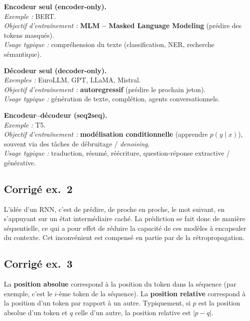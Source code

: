 \documentclass[11pt,a4paper]{article}
\begin{document}
\begin{description}[
  leftmargin=0pt,
  style=nextline,
  font=\normalfont,
  itemsep=1.0\baselineskip,
  parsep=0pt
]
\textbf{Encodeur seul (encoder-only).}\\
\emph{Exemple :} BERT.\\
\emph{Objectif d’entraînement :} \textbf{MLM – Masked Language Modeling} (prédire des tokens masqués).\\
\emph{Usage typique :} compréhension du texte (classification, NER, recherche sémantique).

\medskip

\textbf{Décodeur seul (decoder-only).}\\
\emph{Exemples :} EuroLLM, GPT, LLaMA, Mistral.\\
\emph{Objectif d’entraînement :} \textbf{autoregressif} (prédire le prochain jeton).\\
\emph{Usage typique :} génération de texte, complétion, agents conversationnels.

\medskip

\textbf{Encodeur--décodeur (seq2seq).}\\
\emph{Exemple :} T5.\\
\emph{Objectif d’entraînement :} \textbf{modélisation conditionnelle} (apprendre $p(y \mid x)$), souvent via des tâches de débruitage / \emph{denoising}.\\
\emph{Usage typique :} traduction, résumé, réécriture, question-réponse extractive / générative.

\subsection*{Corrigé ex.~2}

L’idée d’un RNN, c’est de prédire, de proche en proche, le mot suivant, en s’appuyant sur un état intermédiaire caché. La prédiction se fait donc de manière séquentielle, ce qui a pour effet de réduire la capacité de ces modèles à encapsuler du contexte. Cet inconvénient est compensé en partie par de la rétropropagation.

\subsection*{Corrigé ex.~3}

La \textbf{position absolue} correspond à la position du token dans la séquence (par exemple, c'est le $i$-ème token de la séquence). La \textbf{position relative} correspond à la position d'un token par rapport à un autre. Typiquement, si $p$ est la position absolue d'un token et $q$ celle d'un autre, la position relative est $\lvert p - q\rvert$.


\end{description}
\end{document}
